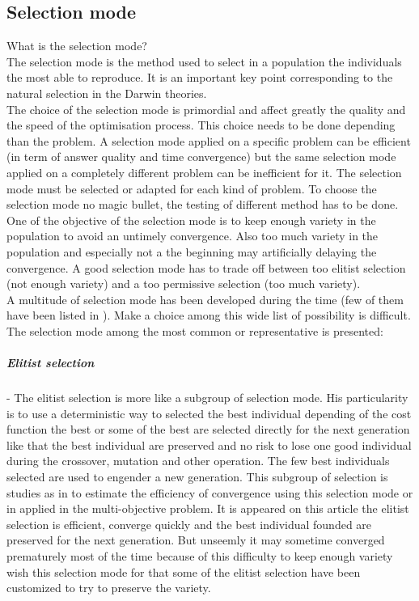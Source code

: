 \subsection{Selection mode  }

 What is the selection mode? \\
 The selection mode is  the method  used to select in a population the individuals the most able to reproduce. It is an important key point corresponding to the natural selection in the Darwin theories. \\
The choice of the selection mode is primordial and affect greatly the quality and the speed of the optimisation process. This choice needs to be done depending than the problem. A selection mode applied on a specific problem  can be efficient (in term of answer quality and time convergence)  but  the same  selection mode applied on  a completely different problem can be inefficient for it.  The selection mode must be selected or adapted for each kind of problem. To choose the selection mode no magic  bullet, the testing of different method has to be done.\\
One of the objective of the selection mode is to keep enough variety in the population to avoid an untimely  convergence. Also too much variety in the population and especially not a the beginning may artificially delaying the convergence. A good selection mode has to trade off between too elitist selection (not enough variety) and a too permissive selection (too much variety). \\
A multitude of selection mode has been developed during the time (few of them have been listed in \cite{123*owais2008}). Make a choice among this wide list of possibility is difficult. The selection mode among the most common  or representative is  presented:    \\

\subparagraph{Elitist selection}
-	The elitist selection is more like a subgroup of selection mode. His particularity is to use a deterministic way to selected the best individual depending of the cost function the best or some of the best are selected directly for the next generation like that the best individual are preserved and no risk  to lose one good individual during the crossover, mutation and other operation. The few best individuals selected are used to engender a new generation.
  This subgroup of selection is studies as in \cite{69*deb2000,64*matsui1999}  to estimate the efficiency of convergence using this selection mode or in \cite{140*soremekun2001} applied in the multi-objective problem. It is appeared on this article the elitist selection is efficient, converge quickly and the best individual founded are preserved  for the next generation. But unseemly it may sometime converged prematurely most of the time because of this difficulty to keep enough variety wish this selection mode for that some of the elitist selection have been customized to try to preserve the variety. \\
	
